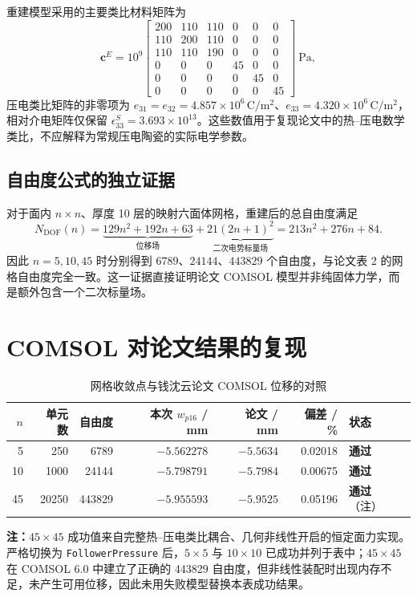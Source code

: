 \documentclass[UTF8,fontset=windows,12pt,a4paper]{ctexart}
\newcommand{\pass}{\textcolor{passgreen}{\textbf{通过}}}
\newcommand{\code}[1]{\texttt{#1}}
\begin{document}
重建模型采用的主要类比材料矩阵为
\[
\mathbf{c}^{E}=10^9
\begin{bmatrix}
200&110&110&0&0&0\\
110&200&110&0&0&0\\
110&110&190&0&0&0\\
0&0&0&45&0&0\\
0&0&0&0&45&0\\
0&0&0&0&0&45
\end{bmatrix}\ \mathrm{Pa},
\]
压电类比矩阵的非零项为 $e_{31}=e_{32}=4.857\times10^6\,\mathrm{C/m^2}$、$e_{33}=4.320\times10^6\,\mathrm{C/m^2}$，相对介电矩阵仅保留 $\epsilon_{33}^{S}=3.693\times10^{13}$。这些数值用于复现论文中的热--压电数学类比，不应解释为常规压电陶瓷的实际电学参数。

\subsection{自由度公式的独立证据}

对于面内 $n\times n$、厚度 10 层的映射六面体网格，重建后的总自由度满足
\[
N_{\mathrm{DOF}}(n)
=\underbrace{129n^2+192n+63}_{\text{位移场}}
+\underbrace{21(2n+1)^2}_{\text{二次电势标量场}}
=213n^2+276n+84.
\]
因此 $n=5,10,45$ 时分别得到 $6789$、$24144$、$443829$ 个自由度，与论文表 2 的网格自由度完全一致。这一证据直接证明论文 COMSOL 模型并非纯固体力学，而是额外包含一个二次标量场。

\section{COMSOL 对论文结果的复现}

\begin{table}[H]
\centering
\caption{网格收敛点与钱沈云论文 COMSOL 位移的对照}
\label{tab:mesh}
\small
\begin{tabular}{rrrrrrl}
\toprule
$n$ & 单元数 & 自由度 & 本次 $w_{p16}$ / mm & 论文 / mm & 偏差 / \% & 状态 \\
\midrule
5  & 250   & 6789   & $-5.562278$ & $-5.5634$ & 0.02018 & \pass \\
10 & 1000  & 24144  & $-5.798791$ & $-5.7984$ & 0.00675 & \pass \\
45 & 20250 & 443829 & $-5.955593$ & $-5.9525$ & 0.05196 & \pass（注） \\
\bottomrule
\end{tabular}

\vspace{0.4em}
\begin{minipage}{0.96\textwidth}
\footnotesize
\textbf{注：}$45\times45$ 成功值来自完整热--压电类比耦合、几何非线性开启的恒定面力实现。严格切换为 \code{FollowerPressure} 后，$5\times5$ 与 $10\times10$ 已成功并列于表中；$45\times45$ 在 COMSOL 6.0 中建立了正确的 443829 自由度，但非线性装配时出现内存不足，未产生可用位移，因此未用失败模型替换本表成功结果。
\end{minipage}
\end{table}
\end{document}
